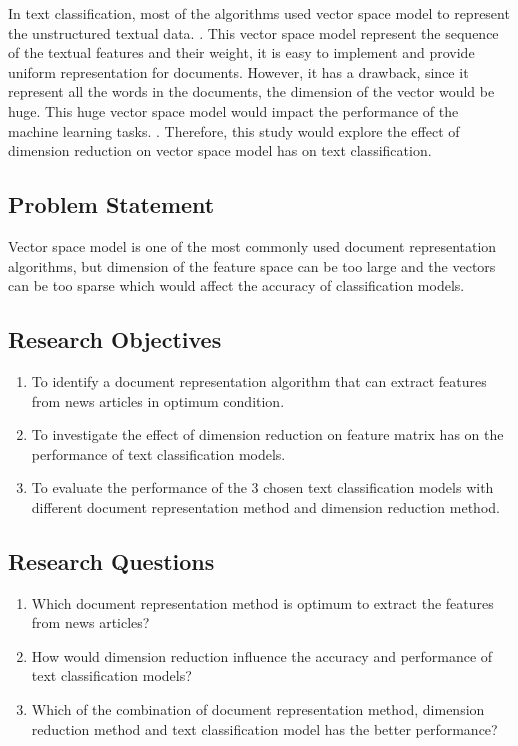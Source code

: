 In text classification, most of the algorithms used vector space model to represent the unstructured textual data. \cite{vectorSpaceModelText}. This vector space model represent the sequence of the textual features and their weight, it is easy to implement and provide uniform representation for documents. However, it has a drawback, since it represent all the words in the documents, the dimension of the vector would be huge. This huge vector space model would impact the performance of the machine learning tasks. \cite{knnVectorSpaceReduction}. Therefore, this study would explore the effect of dimension reduction on vector space model has on text classification.\\

\subsection{Problem Statement}
Vector space model is one of the most commonly used document representation algorithms, but dimension of the feature space can be too large and the vectors can be too sparse which would affect the accuracy of classification models.\\

\subsection{Research Objectives}
\begin{enumerate}
	\item To identify a document representation algorithm that can extract features from news articles in optimum condition.
	\item To investigate the effect of dimension reduction on feature matrix has on the performance of text classification models.
	\item To evaluate the performance of the 3 chosen text classification models with different document representation method and dimension reduction method.
\end{enumerate}


\subsection{Research Questions}
\begin{enumerate}
	\item Which document representation method is optimum to extract the features from news articles?
	\item How would dimension reduction influence the accuracy and performance of text classification models?
	\item Which of the combination of document representation method, dimension reduction method and text classification model has the better performance?
\end{enumerate}

